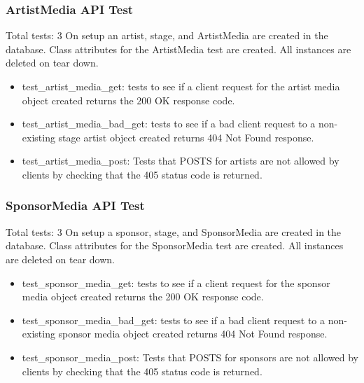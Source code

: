 \documentclass[12pt,english]{scrartcl}
\begin{document}
\subsubsection{ArtistMedia API Test} 
Total tests: 3
On setup an artist, stage, and ArtistMedia are created in the database. Class attributes for the ArtistMedia test are created.
All instances are deleted on tear down.
\begin{itemize}
 \item test\_artist\_media\_get: tests to see if a client request for the artist media object created returns the 200 OK response code.
 
 \item test\_artist\_media\_bad\_get: tests to see if a bad client request to a non-existing stage artist object created returns 
                                     404 Not Found response.
 
 \item test\_artist\_media\_post: Tests that POSTS for artists are not allowed by clients by checking that the 405 status code is returned.
\end{itemize}

\subsubsection{SponsorMedia API Test} 
Total tests: 3
On setup a sponsor, stage, and SponsorMedia are created in the database. Class attributes for the SponsorMedia test are created.
All instances are deleted on tear down.
\begin{itemize}
  \item test\_sponsor\_media\_get: tests to see if a client request for the sponsor media object created returns the 200 OK response code.
 
 \item test\_sponsor\_media\_bad\_get: tests to see if a bad client request to a non-existing sponsor media object created returns 
                                     404 Not Found response.
 
 \item test\_sponsor\_media\_post: Tests that POSTS for sponsors are not allowed by clients by checking that the 405 status code is returned.
\end{itemize}
\end{document}
